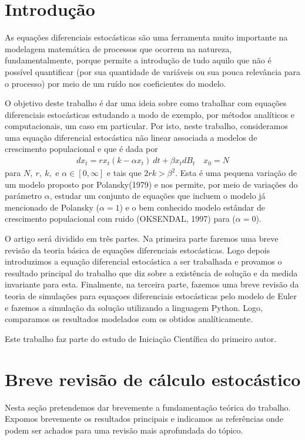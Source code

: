 \documentclass[12pt]{article}
\begin{document}
\section{Introdução}

As equações diferenciais estocásticas são uma ferramenta muito importante na modelagem matemática de processos que ocorrem na natureza, fundamentalmente, porque permite a introdução de tudo aquilo que não é possível quantificar (por sua quantidade de variáveis ou sua pouca relevância para o processo) por meio de um ruído nos coeficientes do modelo.

O objetivo deste trabalho é dar uma ideia sobre como trabalhar com equações diferenciais estocásticas estudando a modo de exemplo, por métodos analíticos e computacionais,  um caso em particular. Por isto, neste trabalho, consideramos uma equação diferencial estocástica não linear associada a modelos de crescimento populacional e que é dada por 
\begin{eqnarray*}
dx_t=rx_t(k-\alpha x_t)~dt+\beta x_tdB_t \quad x_0=N
\end{eqnarray*}
para $N,~r,~k,$ e $\alpha\in[0,\infty]$ e tais que $2rk>\beta^2$.
Esta é uma pequena variação de um modelo proposto por Polansky(1979) e nos permite, por meio de  variações do parámetro $\alpha$, estudar um conjunto de equações que incluem o modelo já mencionado de Polansky ($\alpha=1$) e o bem conhecido modelo estândar de crescimento populacional com ruido (OKSENDAL, 1997) para ($\alpha=0$). 

O artigo será dividido em três partes. Na primeira parte faremos uma breve revisão da teoria básica de equações diferenciais estocásticas. Logo depois introduzimos a equação diferencial estocástica a ser trabalhada e provamos o resultado principal do trabalho que diz sobre a existência de solução e da medida invariante para esta. Finalmente, na terceira parte, fazemos uma breve revisão da teoria de simulações para equaçoes diferenciais estocásticas pelo modelo de Euler e fazemos a simulação da solução utilizando a linguagem Python. Logo, comparamos os resultados modelados com os obtidos analíticamente.  

Este trabalho faz parte do estudo de Iniciação Científica do primeiro autor. 


\section{Breve revisão de cálculo estocástico}
Nesta seção pretendemos dar brevemente a fundamentação teórica do trabalho. Expomos brevemente os resultados principais e indicamos as referências onde podem ser achados para uma revisão mais aprofundada do tópico.  
\end{document}
